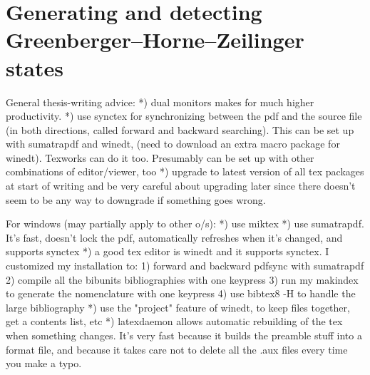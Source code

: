 \chapter[%
    \texorpdfstring{
        Generating and detecting Greenberger--Horne--Zeilinger states}%
    {Generating and detecting GHZ states}]                                 %
    {\selectfont%
        Generating and detecting Greenberger--Horne--Zeilinger states}\label{ch:ghz}%

General thesis-writing advice:
*) dual monitors makes for much higher productivity.
*) use synctex for synchronizing between the pdf and the source file (in both directions, called forward and backward searching). This can be set up with sumatrapdf and winedt, (need to download an extra macro package for winedt). Texworks can do it too. Presumably can be set up with other combinations of editor/viewer, too
*) upgrade to latest version of all tex packages at start of writing and be very careful about upgrading later since there doesn't seem to be any way to downgrade if something goes wrong.

For windows (may partially apply to other o/s):
*) use miktex
*) use sumatrapdf. It's fast, doesn't lock the pdf, automatically refreshes when it's changed, and supports synctex
*) a good tex editor is winedt and it supports synctex. I customized my installation to:
    1) forward and backward pdfsync with sumatrapdf
    2) compile all the bibunits bibliographies with one keypress
    3) run my makindex to generate the nomenclature with one keypress
    4) use bibtex8 -H to handle the large bibliography
*) use the "project" feature of winedt, to keep files together, get a contents list, etc
*) latexdaemon allows automatic rebuilding of the tex when something changes. It's very fast because it builds the preamble stuff into a format file, and because it takes care not to delete all the .aux files every time you make a typo.

